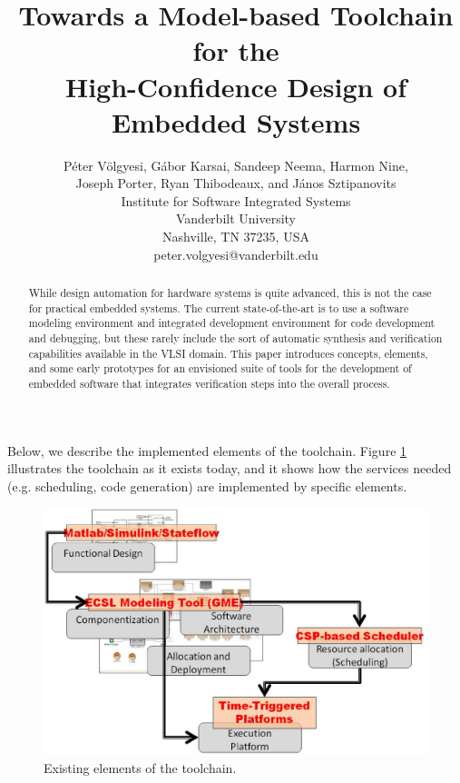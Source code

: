 \documentclass[times, 10pt,twocolumn]{article}
\begin{document}
\title{Towards a Model-based Toolchain for the \\
High-Confidence Design of Embedded Systems}

\author{P\'{e}ter V\"{o}lgyesi, G\'{a}bor Karsai,  Sandeep Neema, Harmon Nine, \\
Joseph Porter, Ryan Thibodeaux,  and J\'{a}nos Sztipanovits \\
Institute for Software Integrated Systems \\
Vanderbilt University\\
Nashville, TN 37235, USA \\
peter.volgyesi@vanderbilt.edu\\
}
\maketitle
\thispagestyle{empty}
\begin{abstract}
While design automation for hardware systems is quite advanced,
this is not the case for practical embedded systems. The current
state-of-the-art is to use a software modeling environment
and integrated development environment for code development and debugging, but
these rarely include the sort of automatic synthesis and
verification capabilities available in the VLSI domain. This paper
introduces concepts, elements, and some early prototypes for
an envisioned suite of tools for the development of embedded
software that integrates verification steps into the overall
process.
\end{abstract}





Below, we describe the implemented elements of the toolchain. Figure \ref{fig:existing} illustrates the toolchain as it exists today, and it shows how the services needed (e.g. scheduling, code generation) are implemented by specific elements.

\begin{figure}[h]
   \includegraphics[width=0.9\columnwidth]{existing}
   \caption{Existing elements of the toolchain.}
   \label{fig:existing}
\end{figure}
\end{document}
